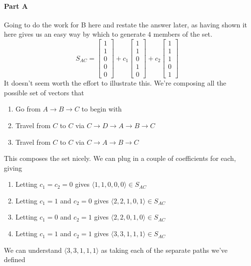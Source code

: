 \documentclass{article}
\begin{document}
            \paragraph{Part A}
                Going to do the work for B here and restate the answer later,
                as having shown it here gives us an easy way by which to generate
                $4$ members of the set.
                \[
                S_{AC}=
                \begin{bmatrix}1\\1\\0\\0\\0\end{bmatrix}
                +
                c_1\begin{bmatrix}1\\1\\0\\1\\0\end{bmatrix}
                +
                c_2\begin{bmatrix}1\\1\\1\\0\\1\end{bmatrix}
                \]
                It doesn't seem worth the effort to illustrate this. We're
                composing all the possible set of vectors that
                \begin{enumerate}
                    \item Go from $A\rightarrow B\rightarrow C$ to begin with
                    \item Travel from $C$ to $C$ via $C\rightarrow D\rightarrow A\rightarrow B\rightarrow C$
                    \item Travel from $C$ to $C$ via $C\rightarrow A\rightarrow B\rightarrow C$
                \end{enumerate}
                This composes the set nicely. We can plug in a couple of coefficients for each, giving
                \begin{enumerate}
                    \item Letting $c_1=c_2=0$ gives $\langle 1, 1, 0, 0, 0\rangle \in S_{AC}$
                    \item Letting $c_1=1$ and $c_2=0$ gives $\langle 2, 2, 1, 0, 1\rangle \in S_{AC}$
                    \item Letting $c_1=0$ and $c_2=1$ gives $\langle 2, 2, 0, 1, 0\rangle \in S_{AC}$
                    \item Letting $c_1=1$ and $c_2=1$ gives $\langle 3, 3, 1, 1, 1\rangle \in S_{AC}$
                \end{enumerate}
                We can understand $\langle 3, 3, 1, 1, 1\rangle$ as taking each of the separate paths we've defined
\end{document}
